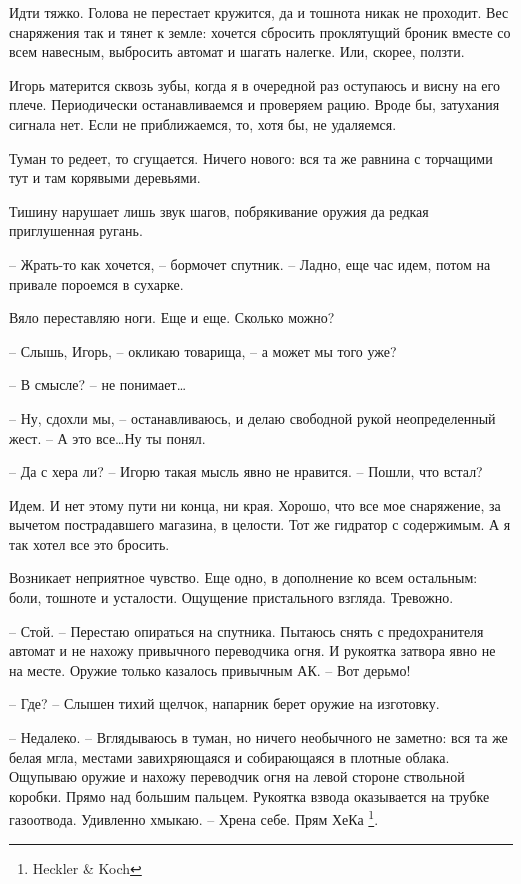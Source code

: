 \documentclass[a4paper]{book}
\begin{document}
Идти тяжко. Голова не перестает кружится, да и тошнота никак не проходит. Вес снаряжения так и тянет к земле: хочется сбросить проклятущий броник вместе со всем навесным, выбросить автомат и шагать налегке. Или, скорее, ползти. 

Игорь матерится сквозь зубы, когда я в очередной раз оступаюсь и висну на его плече. Периодически останавливаемся и проверяем рацию. Вроде бы, затухания сигнала нет. Если не приближаемся, то, хотя бы, не удаляемся.

Туман то редеет, то сгущается. Ничего нового: вся та же равнина с торчащими тут и там корявыми деревьями. 

Тишину нарушает лишь звук шагов, побрякивание оружия да редкая приглушенная ругань. 

-- Жрать-то как хочется, -- бормочет спутник. -- Ладно, еще час идем, потом на привале пороемся в сухарке. 

Вяло переставляю ноги. Еще и еще. Сколько можно?

-- Слышь, Игорь, -- окликаю товарища, -- а может мы того уже? 

-- В смысле? -- не понимает\ldots

-- Ну, сдохли мы, -- останавливаюсь, и делаю свободной рукой неопределенный жест. -- А это все\ldots Ну ты понял.

-- Да с хера ли? -- Игорю такая мысль явно не нравится. -- Пошли, что встал?

Идем. И нет этому пути ни конца, ни края. Хорошо, что все мое снаряжение, за вычетом пострадавшего магазина, в целости. Тот же гидратор с содержимым. А я так хотел все это бросить. 

Возникает неприятное чувство. Еще одно, в дополнение ко всем остальным: боли, тошноте и усталости. Ощущение пристального взгляда. Тревожно.

-- Стой. -- Перестаю опираться на спутника. Пытаюсь снять с предохранителя автомат и не нахожу привычного переводчика огня. И рукоятка затвора явно не на месте. Оружие только казалось привычным АК. -- Вот дерьмо!

-- Где? -- Слышен тихий щелчок, напарник берет оружие на изготовку. 

-- Недалеко. -- Вглядываюсь в туман, но ничего необычного не заметно: вся та же белая мгла, местами завихряющаяся и собирающаяся в плотные облака. Ощупываю оружие и нахожу переводчик огня на левой стороне ствольной коробки. Прямо над большим пальцем. Рукоятка взвода оказывается на трубке газоотвода. Удивленно хмыкаю. -- Хрена себе. Прям ХеКа \footnote{Heckler \& Koch}. 
\end{document}

